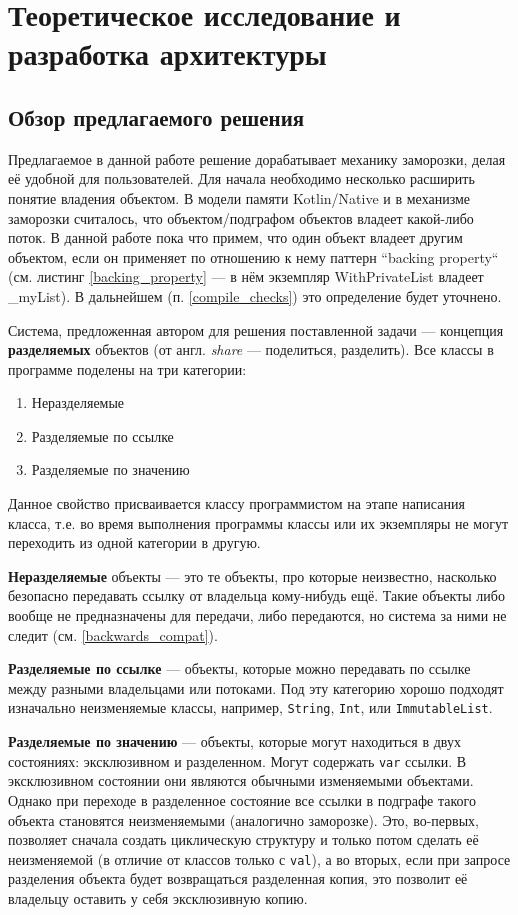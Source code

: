 \documentclass[specification,annotation,times]{itmo-student-thesis}
\begin{document}
\chapter{Теоретическое исследование и разработка архитектуры}

\section{Обзор предлагаемого решения}

Предлагаемое в данной работе решение дорабатывает механику заморозки, делая её удобной для пользователей.
Для начала необходимо несколько расширить понятие владения объектом.
В модели памяти Kotlin/Native и в механизме заморозки считалось, что объектом/подграфом объектов владеет какой-либо поток.
В данной работе пока что примем, что один объект владеет другим объектом, если он применяет по отношению к нему паттерн ``backing property`` (см. листинг \ref{backing_property} --- в нём экземпляр WithPrivateList владеет \_myList). В дальнейшем (п. \ref{compile_checks}) это определение будет уточнено.

Система, предложенная автором для решения поставленной задачи --- концепция \textbf{разделяемых} объектов (от англ. \textit{share} --- поделиться, разделить).
Все классы в программе поделены на три категории:
\begin{enumerate}
	\item Неразделяемые
	\item Разделяемые по ссылке
	\item Разделяемые по значению
\end{enumerate}

Данное свойство присваивается классу программистом на этапе написания класса, т.е. во время выполнения программы классы или их экземпляры не могут переходить из одной категории в другую.

\textbf{Неразделяемые} объекты --- это те объекты, про которые неизвестно, насколько безопасно передавать ссылку от владельца кому-нибудь ещё.
Такие объекты либо вообще не предназначены для передачи, либо передаются, но система за ними не следит (см. \ref{backwards_compat}).

\textbf{Разделяемые по ссылке} --- объекты, которые можно передавать по ссылке между разными владельцами или потоками.
Под эту категорию хорошо подходят изначально неизменяемые классы, например, \texttt{String}, \texttt{Int}, или \texttt{ImmutableList}.

\textbf{Разделяемые по значению} --- объекты, которые могут находиться в двух состояниях: эксклюзивном и разделенном. Могут содержать \texttt{var} ссылки.
В эксклюзивном состоянии они являются обычными изменяемыми объектами.
Однако при переходе в разделенное состояние все ссылки в подграфе такого объекта становятся неизменяемыми (аналогично заморозке).
Это, во-первых, позволяет сначала создать циклическую структуру и только потом сделать её неизменяемой (в отличие от классов только с \texttt{val}),
а во вторых, если при запросе разделения объекта будет возвращаться разделенная копия, это позволит её владельцу оставить у себя эксклюзивную копию.
\end{document}
